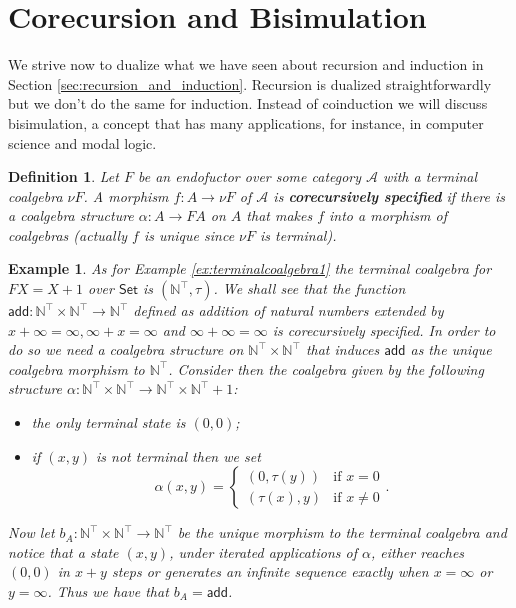 \documentclass[letterpaper, 11pt, oneside]{memoir}
\theoremstyle{myteo}
\newtheorem{definition}[theorem]{Definition}
\newtheorem{example}[theorem]{Example}
\numberwithin{equation}{section}
\newcommand{\marginnote}[1]{\marginpar{\footnotesize #1}}
\newcommand{\Set}{\textsf{Set}}
\newcommand{\A}{\mathscr{A}}
\begin{document}
\section{Corecursion and Bisimulation}

We strive now to dualize what we have seen about recursion and induction in Section \ref{sec:recursion_and_induction}.
Recursion is dualized straightforwardly but we don't do the same for induction.
Instead of coinduction we will discuss bisimulation, a concept that has many applications, for instance, in computer science and modal logic.

\begin{definition}
  Let \(F\) be an endofuctor over some category \(\A\) with a terminal coalgebra \(\nu F\).
  A morphism \(f: A \to \nu F\) of \(\A\) is \textbf{corecursively specified} \marginnote{corecursively specified morphism} if there is a coalgebra structure \(\alpha : A \to FA\) on \(A\) that makes \(f\) into a morphism of coalgebras (actually \(f\) is unique since \(\nu F\) is terminal).
\end{definition}

\begin{example}
  \label{ex:corecursive-specification-of-addition}
  As for Example \ref{ex:terminalcoalgebra1} the terminal coalgebra for \(FX = X + 1\) over \(\Set\) is \((\mathbb{N}^\top, \tau)\).
  We shall see that the function \(\textsf{add} : \mathbb{N}^\top \times \mathbb{N}^\top \to \mathbb{N}^\top\) defined as addition of natural numbers extended by \(x + \infty = \infty, \infty + x = \infty\) and \(\infty + \infty = \infty\) is corecursively specified.
  In order to do so we need a coalgebra structure on \(\mathbb{N}^\top \times \mathbb{N}^\top\) that induces \(\textsf{add}\) as the unique coalgebra morphism to \(\mathbb{N}^\top\).
  Consider then the coalgebra given by the following structure \(\alpha: \mathbb{N}^\top \times \mathbb{N}^\top \to \mathbb{N}^\top \times \mathbb{N}^\top + 1\):
  \begin{itemize}
  \item[1.] the only terminal state is \((0, 0)\);
  \item[2.] if \((x, y)\) is not terminal then we set
    \begin{equation*}
      \alpha(x, y) =
      \begin{cases}
        (0, \tau(y)) & \text{if } x = 0\\
        (\tau(x), y) & \text{if } x \neq 0
      \end{cases}.
    \end{equation*}
  \end{itemize}
  Now let \(b_A : \mathbb{N}^\top \times \mathbb{N}^\top \to \mathbb{N}^\top\) be the unique morphism to the terminal coalgebra and notice that a state \((x, y)\), under iterated applications of \(\alpha\), either reaches \((0, 0)\) in \(x + y\) steps or generates an infinite sequence exactly when \(x = \infty\) or \(y = \infty\).
  Thus we have that \(b_A = \textsf{add}\).
\end{example}
\end{document}
